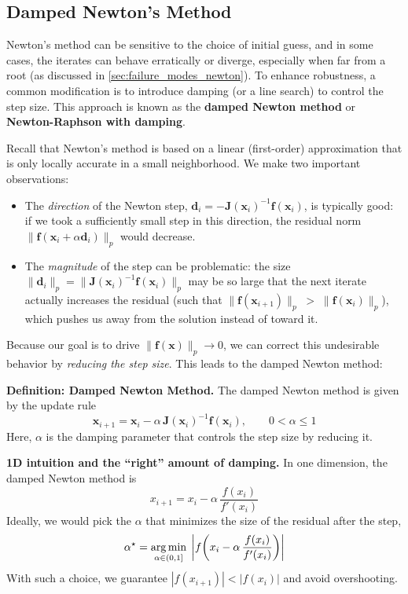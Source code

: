 \subsection{Damped Newton's Method}

Newton's method can be sensitive to the choice of initial guess, and in some cases, the iterates can behave erratically or diverge, especially when far from a root (as discussed in \autoref{sec:failure_modes_newton}). To enhance robustness, a common modification is to introduce damping (or a line search) to control the step size. This approach is known as the \textbf{damped Newton method} or \textbf{Newton-Raphson with damping}.

Recall that Newton's method is based on a linear (first-order) approximation that is only locally accurate in a small neighborhood. We make two important observations:
\begin{itemize}
  \item The \emph{direction} of the Newton step, 
  \(\mathbf{d}_i=-\mathbf{J}(\mathbf{x}_i)^{-1}\mathbf{f}(\mathbf{x}_i)\), is typically good: if we took a sufficiently small step in this direction, the residual norm 
  \(\lVert \mathbf{f}(\mathbf{x}_i+\alpha \mathbf{d}_i)\rVert_p\) 
  would decrease.
  \item The \emph{magnitude} of the step can be problematic: the size 
  \(\lVert \mathbf{d}_i\rVert_p=\lVert \mathbf{J}(\mathbf{x}_i)^{-1}\mathbf{f}(\mathbf{x}_i)\rVert_p\) 
  may be so large that the next iterate actually increases the residual (such that \( \lVert \mathbf{f}(\mathbf{x}_{i+1})\rVert_p \;>\; \lVert \mathbf{f}(\mathbf{x}_i)\rVert_p \)), which pushes us away from the solution instead of toward it.
\end{itemize}
Because our goal is to drive \(\lVert \mathbf{f}(\mathbf{x})\rVert_p \to 0\), we can correct this undesirable behavior by \emph{reducing the step size}. This leads to the damped Newton method:
\begin{definitionBox}
    \textbf{Definition: Damped Newton Method.}
    The damped Newton method is given by the update rule
    \begin{equation}
    \mathbf{x}_{i+1}=\mathbf{x}_i-\alpha\,\mathbf{J}(\mathbf{x}_i)^{-1}\mathbf{f}(\mathbf{x}_i),\qquad 0<\alpha\le 1
    \end{equation}
    Here, $\alpha$ is the damping parameter that controls the step size by reducing it.
\end{definitionBox}

\textbf{1D intuition and the ``right'' amount of damping.} In one dimension, the damped Newton method is
\begin{equation}
x_{i+1}=x_i-\alpha\,\frac{f(x_i)}{f'(x_i)}
\end{equation}
Ideally, we would pick the \(\alpha\) that minimizes the size of the residual after the step,
\begin{equation}
\alpha^\star = \operatorname*{arg\,min}_{\alpha\in(0,1]}\; \left| f\!\left(x_i-\alpha\,\frac{f(x_i)}{f'(x_i)}\right) \right|
\end{equation}
With such a choice, we guarantee \(|f(x_{i+1})|<|f(x_i)|\) and avoid overshooting.


